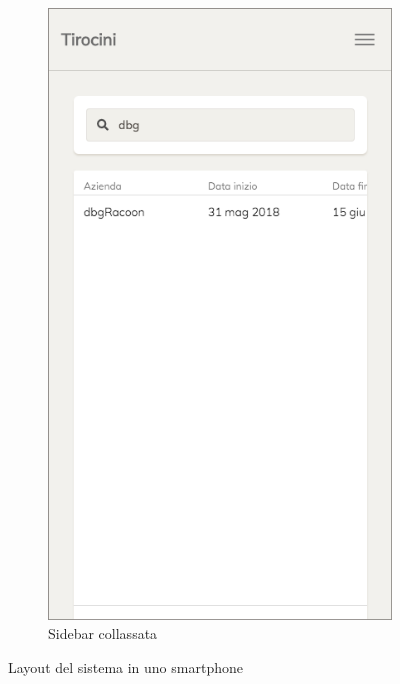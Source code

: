 \begin{figure}[H]
\begin{subfigure}[b]{0.4\textwidth}
		\includegraphics[width=1\textwidth]{Chapter2/Figs/xs-closed}     
		\caption{Sidebar collassata}
		\label{fig:screenshot:14}
	\end{subfigure}  
	\caption[Screenshot: layout del sistema in uno smartphone]{Layout del sistema in uno smartphone}
	\label{fig:screenshot:13-14}
\end{figure}